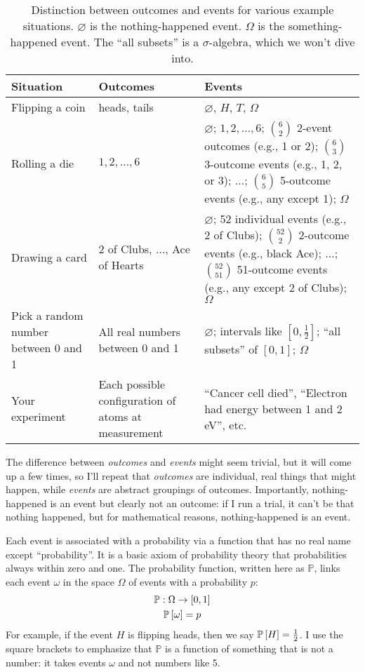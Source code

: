\begin{table}
\centering
\begin{tabular}{p{3cm}p{4cm}p{6cm}}
\toprule
Situation & Outcomes & Events \\
\midrule
Flipping a coin & heads, tails & $\varnothing$, $H$, $T$, $\Omega$ \\
Rolling a die & $1, 2, \ldots, 6$ & $\varnothing$; $1, 2, \ldots, 6$; $\binom{6}{2}$ 2-event outcomes (e.g., 1 or 2); $\binom{6}{3}$ 3-outcome events (e.g., 1, 2, or 3); $\ldots$; $\binom{6}{5}$ 5-outcome events (e.g., any except 1); $\Omega$ \\
Drawing a card & 2 of Clubs, $\ldots$, Ace of Hearts & $\varnothing$; 52 individual events (e.g., 2 of Clubs); $\binom{52}{2}$ 2-outcome events (e.g., black Ace); $\ldots$; $\binom{52}{51}$ 51-outcome events (e.g., any except 2 of Clubs); $\Omega$ \\
Pick a random number between 0 and 1 & All real numbers between 0 and 1 & $\varnothing$; intervals like $[0, \tfrac{1}{2}]$; ``all subsets'' of $[0, 1]$; $\Omega$ \\
Your experiment & Each possible configuration of atoms at measurement & ``Cancer cell died'', ``Electron had energy between 1 and 2 eV'', etc. \\
\bottomrule
\end{tabular}
\caption{Distinction between outcomes and events for various example situations. $\varnothing$ is the nothing-happened event. $\Omega$ is the something-happened event. The ``all subsets'' is a $\sigma$-algebra, which we won't dive into.}
\label{tab:outcome-event}
\end{table}

The difference between \emph{outcomes} and \emph{events} might seem trivial,
but it will come up a few times, so I'll repeat that \emph{outcomes} are
individual, real things that might happen, while \emph{events} are abstract
groupings of outcomes. Importantly, nothing-happened is an event but clearly
not an outcome: if I run a trial, it can't be that nothing happened, but
for mathematical reasons, nothing-happened is an event.

Each event is associated with a probability via a function that has no real
name except ``probability''. It is a basic axiom of probability theory that
probabilities always within zero and one. The probability function, written
here as $\mathbb{P}$, links each event $\omega$ in the space $\Omega$ of
events with a probability $p$:
\begin{gather*}
\mathbb{P} : \Omega \to [0, 1] \\
\mathbb{P}\left[{\omega}\right] = p
\end{gather*}
For example, if the event $H$ is flipping heads, then we say
$\mathbb{P}\left[{H}\right] = \tfrac{1}{2}$. I use the square brackets to emphasize
that $\mathbb{P}$ is a function of something that is not a number: it takes
events $\omega$ and not numbers like 5.

